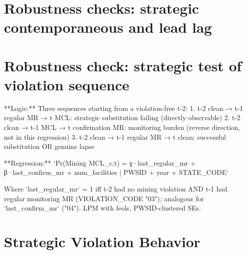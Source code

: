 \documentclass{article}
\begin{document}
\begin{frame}

\end{frame}

\begin{frame}

\end{frame}

\section{Robustness checks: strategic contemporaneous and lead lag}

\begin{frame}

\end{frame}

\begin{frame}

\end{frame}

\begin{frame}

\end{frame}

\section{Robustness check: strategic test of violation sequence}

\begin{frame}{}
**Logic:** Three sequences starting from a violation-free t-2:
1. t-2 clean → t-1 regular MR → t MCL: strategic substitution failing (directly observable)
2. t-2 clean → t-1 MCL → t confirmation MR: monitoring burden (reverse direction, not in this regression)
3. t-2 clean → t-1 regular MR → t clean: successful substitution OR genuine lapse

**Regression:** `Pr(Mining MCL_{c,t}) = γ·last_regular_mr + β·last_confirm_mr + num_facilities | PWSID + year + STATE_CODE`

Where `last_regular_mr` = 1 iff t-2 had no mining violation AND t-1 had regular monitoring MR (VIOLATION_CODE "03"); analogous for `last_confirm_mr` ("04"). LPM with feols, PWSID-clustered SEs.    
\end{frame}

\begin{frame}{}

\end{frame}

\section{Strategic Violation Behavior}
\end{document}

